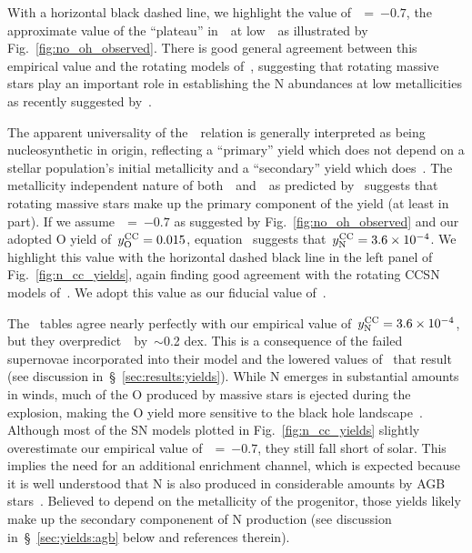 \documentclass[ms.tex]{subfiles}
\begin{document}
With a horizontal black dashed line, we highlight the value
of~\no\subcc~=~$-0.7$, the approximate value of the ``plateau'' in~\no~at
low~\oh~as illustrated by Fig.~\ref{fig:no_oh_observed}.
There is good general agreement between this empirical value and the rotating
models of~\citet{Limongi2018}, suggesting that rotating massive stars play an
important role in establishing the N abundances at low metallicities as
recently suggested by~\citet{Grisoni2021}.
\par
The apparent universality of the~\ohno~relation is generally interpreted as
being nucleosynthetic in origin, reflecting a ``primary'' yield which does not
depend on a stellar population's initial metallicity and a ``secondary'' yield
which does~\citep[e.g.][]{PerezMontero2009, Berg2012, Pilyugin2012,
Andrews2013}.
The metallicity independent nature of both~~and~\no\subcc~as predicted
by~\citet{Limongi2018} suggests that rotating massive stars make up the primary
component of the yield (at least in part).
If we assume~\no\subcc~=~$-0.7$ as suggested by Fig.~\ref{fig:no_oh_observed}
and our adopted O yield of~$y_\text{O}^\text{CC} = 0.015$, equation~
suggests that~$y_\text{N}^\text{CC} = 3.6\times10^{-4}$.
We highlight this value with the horizontal dashed black line in the left panel
of Fig.~\ref{fig:n_cc_yields}, again finding good agreement with the rotating
CCSN models of~\citet{Limongi2018}.
We adopt this value as our fiducial value of~.
\par
The~\citet{Sukhbold2016} tables agree nearly perfectly with our empirical value
of~$y_\text{N}^\text{CC} = 3.6\times10^{-4}$, but they overpredict~\no\subcc~by~$\sim$0.2
dex.
This is a consequence of the failed supernovae incorporated into their model
and the lowered values of~ that result (see discussion
in~\S~\ref{sec:results:yields}).
While N emerges in substantial amounts in winds, much of the O produced by
massive stars is ejected during the explosion, making the O yield more
sensitive to the black hole landscape~\citep{Griffith2021a}.
Although most of the SN models plotted in Fig.~\ref{fig:n_cc_yields} slightly
overestimate our empirical value of~\no\subcc~=~$-0.7$, they still fall short
of solar.
This implies the need for an additional enrichment channel, which is expected
because it is well understood that N is also produced in considerable amounts
by AGB stars~\citep{Johnson2019}.
Believed to depend on the metallicity of the progenitor, those yields likely
make up the secondary componenent of N production (see discussion
in~\S~\ref{sec:yields:agb} below and references therein).
\end{document}

